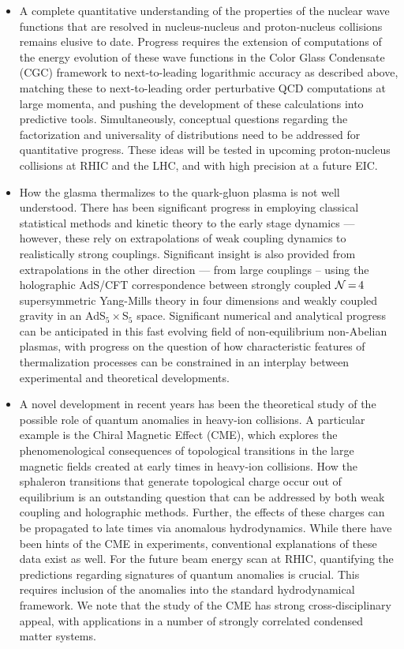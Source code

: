 \begin{itemize}

\item
A complete quantitative understanding of the properties of the nuclear wave functions that are resolved in nucleus-nucleus and proton-nucleus collisions remains elusive to date. Progress requires the extension of computations of the energy evolution of these wave functions in the Color Glass Condensate (CGC) framework to next-to-leading logarithmic accuracy as described above, matching these to next-to-leading order perturbative QCD computations at large momenta, and pushing the development of these
calculations into predictive tools. 
Simultaneously, conceptual questions regarding the factorization and universality of distributions need to be addressed for quantitative progress. These ideas will be tested in upcoming proton-nucleus collisions at RHIC and the LHC, and with high precision at a future EIC. 

\item
How the glasma thermalizes to the quark-gluon plasma is not well understood. There has been significant progress in employing classical statistical methods and kinetic theory to the early stage dynamics --- however, these rely on extrapolations of weak coupling dynamics to realistically strong couplings. Significant insight is also provided from extrapolations in the other direction --- from large couplings -- using the holographic AdS/CFT correspondence between strongly coupled ${\cal N}{\,=\,}4$ supersymmetric Yang-Mills theory in four dimensions and weakly coupled gravity in an AdS$_5{\times}$S$_5$ space. Significant numerical and analytical progress can be anticipated in this fast evolving field of non-equilibrium non-Abelian plasmas, with progress on
the question of how
characteristic features of thermalization processes can be constrained in an interplay between experimental and
 theoretical developments. 

\item
A novel development in recent years has been the theoretical study of the possible role of quantum anomalies in heavy-ion collisions. A particular example is the Chiral Magnetic Effect (CME), which explores the phenomenological consequences of topological transitions in the large magnetic fields created at early times in heavy-ion collisions. How the sphaleron transitions that generate topological charge occur out of equilibrium is an outstanding question that can be addressed by both weak coupling and holographic methods. Further, the effects of these charges can be propagated to late times via anomalous hydrodynamics. While there have been hints of the CME in experiments, conventional explanations of these data exist as well. For the future beam energy scan at RHIC, quantifying the predictions regarding signatures of quantum anomalies is crucial. This requires inclusion of the anomalies into the standard 
hydrodynamical framework. We note that the study of the CME has strong cross-disciplinary appeal, with applications in a number of strongly correlated condensed matter systems. 


\end{itemize}
